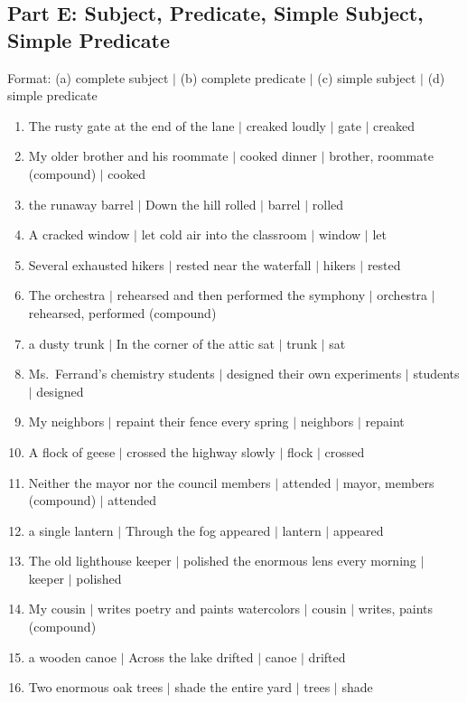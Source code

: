 \documentclass[11pt]{article}
\begin{document}
\subsection*{Part E: Subject, Predicate, Simple Subject, Simple Predicate}
\noindent\small Format: (a) complete subject $\mid$ (b) complete predicate $\mid$ (c) simple subject $\mid$ (d) simple predicate\normalsize
\begin{enumerate}
  \item The rusty gate at the end of the lane $\mid$ creaked loudly $\mid$ gate $\mid$ creaked
  \item My older brother and his roommate $\mid$ cooked dinner $\mid$ brother, roommate (compound) $\mid$ cooked
  \item the runaway barrel $\mid$ Down the hill rolled $\mid$ barrel $\mid$ rolled
  \item A cracked window $\mid$ let cold air into the classroom $\mid$ window $\mid$ let
  \item Several exhausted hikers $\mid$ rested near the waterfall $\mid$ hikers $\mid$ rested
  \item The orchestra $\mid$ rehearsed and then performed the symphony $\mid$ orchestra $\mid$ rehearsed, performed (compound)
  \item a dusty trunk $\mid$ In the corner of the attic sat $\mid$ trunk $\mid$ sat
  \item Ms.\ Ferrand's chemistry students $\mid$ designed their own experiments $\mid$ students $\mid$ designed
  \item My neighbors $\mid$ repaint their fence every spring $\mid$ neighbors $\mid$ repaint
  \item A flock of geese $\mid$ crossed the highway slowly $\mid$ flock $\mid$ crossed
  \item Neither the mayor nor the council members $\mid$ attended $\mid$ mayor, members (compound) $\mid$ attended
  \item a single lantern $\mid$ Through the fog appeared $\mid$ lantern $\mid$ appeared
  \item The old lighthouse keeper $\mid$ polished the enormous lens every morning $\mid$ keeper $\mid$ polished
  \item My cousin $\mid$ writes poetry and paints watercolors $\mid$ cousin $\mid$ writes, paints (compound)
  \item a wooden canoe $\mid$ Across the lake drifted $\mid$ canoe $\mid$ drifted
  \item Two enormous oak trees $\mid$ shade the entire yard $\mid$ trees $\mid$ shade

\end{enumerate}
\end{document}
